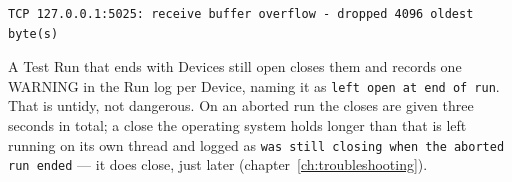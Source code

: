 \begin{lstlisting}[language=ATEShell]
TCP 127.0.0.1:5025: receive buffer overflow - dropped 4096 oldest byte(s)
\end{lstlisting}

A Test Run that ends with Devices still open closes them and records one WARNING in the Run log per
Device, naming it as \texttt{left open at end of run}. That is untidy, not dangerous. On an aborted
run the closes are given three seconds in total; a close the operating system holds longer than that
is left running on its own thread and logged as \texttt{was still closing when the aborted run ended}
--- it does close, just later (chapter~\ref{ch:troubleshooting}).

